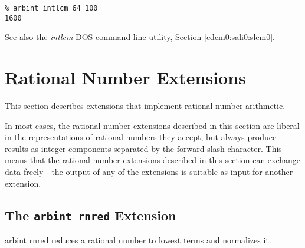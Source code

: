 \begin{tclcommandsampleinvocations}
\begin{scriptsize}
\begin{verbatim}
% arbint intlcm 64 100
1600
\end{verbatim}
\end{scriptsize}
\end{tclcommandsampleinvocations}

\begin{tclcommandseealso}
See also the \emph{intlcm} DOS command-line utility, 
Section \cdcmzeroxrefhyphen{}\ref{cdcm0:sali0:slcm0}.
\end{tclcommandseealso}


\section{Rational Number Extensions}

This section describes extensions that implement
rational number arithmetic.

In most cases, the rational number extensions described in
this section are liberal in the representations of rational numbers
they accept, but always produce results as integer components
separated by the forward slash character.  This means that the
rational number extensions described in this section can exchange data
freely---the output of any of the extensions is suitable as input
for another extension.


\subsection{The \texttt{arbint rnred} Extension}
\label{cxtn0:srne0:srnr0}

\begin{tclcommandname}{arbint rnred}%
reduces a rational number to lowest terms and normalizes it.
\end{tclcommandname}

